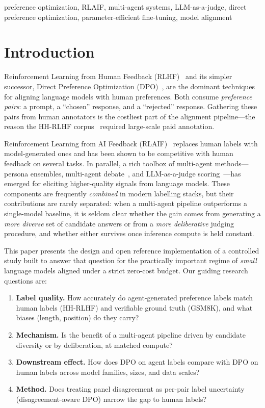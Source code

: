 \documentclass[conference]{IEEEtran}
\begin{document}
\begin{IEEEkeywords}
preference optimization, RLAIF, multi-agent systems, LLM-as-a-judge, direct
preference optimization, parameter-efficient fine-tuning, model alignment
\end{IEEEkeywords}

\section{Introduction}
Reinforcement Learning from Human Feedback (RLHF)~\cite{ouyang2022instructgpt}
and its simpler successor, Direct Preference Optimization
(DPO)~\cite{rafailov2023dpo}, are the dominant techniques for aligning language
models with human preferences. Both consume \emph{preference pairs}: a prompt, a
``chosen'' response, and a ``rejected'' response. Gathering these pairs from
human annotators is the costliest part of the alignment pipeline---the reason the
HH-RLHF corpus~\cite{bai2022hh} required large-scale paid annotation.

Reinforcement Learning from AI Feedback
(RLAIF)~\cite{bai2022constitutional,lee2023rlaif} replaces human labels with
model-generated ones and has been shown to be competitive with human feedback on
several tasks. In parallel, a rich toolbox of multi-agent methods---persona
ensembles, multi-agent debate~\cite{du2023debate}, and LLM-as-a-judge
scoring~\cite{zheng2023judge}---has emerged for eliciting higher-quality signals
from language models. These components are frequently \emph{combined} in modern
labelling stacks, but their contributions are rarely separated: when a
multi-agent pipeline outperforms a single-model baseline, it is seldom clear
whether the gain comes from generating a \emph{more diverse} set of candidate
answers or from a \emph{more deliberative} judging procedure, and whether either
survives once inference compute is held constant.

This paper presents the design and open reference implementation of a controlled
study built to answer that question for the practically important regime of
\emph{small} language models aligned under a strict zero-cost budget. Our guiding
research questions are:
\begin{enumerate}
\item \textbf{Label quality.} How accurately do agent-generated preference labels
match human labels (HH-RLHF) and verifiable ground truth (GSM8K), and what biases
(length, position) do they carry?
\item \textbf{Mechanism.} Is the benefit of a multi-agent pipeline driven by
candidate diversity or by deliberation, at matched compute?
\item \textbf{Downstream effect.} How does DPO on agent labels compare with DPO on
human labels across model families, sizes, and data scales?
\item \textbf{Method.} Does treating panel disagreement as per-pair label
uncertainty (disagreement-aware DPO) narrow the gap to human labels?
\end{enumerate}
\end{document}
